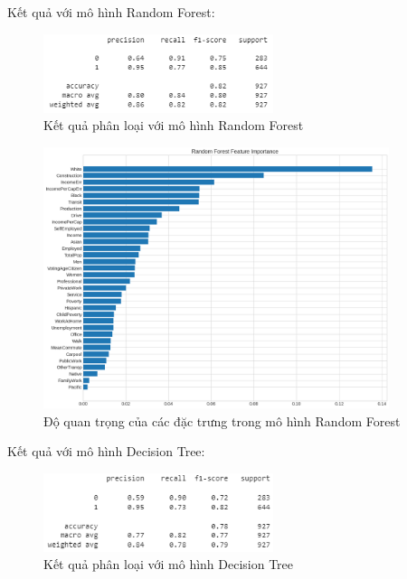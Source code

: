\documentclass[14pt, a4paper]{article}
\numberwithin{equation}{section}
\numberwithin{figure}{section}
\numberwithin{dl}{section}
\numberwithin{md}{section}
\numberwithin{bd}{section}
\numberwithin{dn}{section}
\numberwithin{hq}{section}
\begin{document}
    Kết quả với mô hình Random Forest:

    \begin{figure}[h!]
        \centering
        \includegraphics[width=0.6\textwidth]{figures/Random_Forest_Feature_Report.png}
        \caption{Kết quả phân loại với mô hình Random Forest}
    \end{figure}

    \begin{figure}[h!]
        \centering
        \includegraphics[width=0.9\textwidth]{figures/Random_Forest_Feature_Importance.png}
        \caption{Độ quan trọng của các đặc trưng trong mô hình Random Forest}
    \end{figure}

    Kết quả với mô hình Decision Tree:

    \begin{figure}[h!]
        \centering
        \includegraphics[width=0.6\textwidth]{figures/Decision_Tree_Report.png}
        \caption{Kết quả phân loại với mô hình Decision Tree}
    \end{figure}
\end{document}
